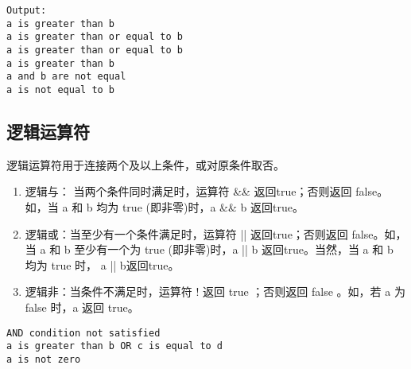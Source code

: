 \begin{frame}[fragile]\ft{\subsecname}
\begin{lstlisting}[backgroundcolor=\color{red!10}]
Output:
a is greater than b
a is greater than or equal to b
a is greater than or equal to b
a is greater than b
a and b are not equal
a is not equal to b  
\end{lstlisting}  
\end{frame}


\subsection{逻辑运算符}
\begin{frame}
  逻辑运算符用于连接两个及以上条件，或对原条件取否。%
\begin{enumerate}
\item
  \textcolor{acolor3}{逻辑与}： 当两个条件同时满足时，运算符 {\tf \&\&} 返回{\tf true}；否则返回 {\tf false}。如，当 {\tf a} 和 {\tf b} 均为 {\tf true} (即非零)时，{\tf a \&\& b} 返回{\tf true}。
\item
  \textcolor{acolor3}{逻辑或}：当至少有一个条件满足时，运算符 {\tf ||} 返回{\tf true}；否则返回 {\tf false}。如，当 {\tf a} 和 {\tf b} 至少有一个为 {\tf true} (即非零)时，{\tf a || b} 返回{\tf true}。当然，当 {\tf a} 和 {\tf b} 均为 {\tf true} 时， {\tf a || b}返回{\tf true}。
\item
  \textcolor{acolor3}{逻辑非}：当条件不满足时，运算符 {\tf !} 返回 {\tf true} ；否则返回 {\tf false} 。如，若 {\tf a} 为 {\tf false} 时，{\tf a} 返回 {\tf true}。
\end{enumerate}
  
\end{frame}

\begin{frame}\ft{\subsecname}

  
\end{frame}


\begin{frame}[fragile]\ft{\subsecname}

\begin{lstlisting}[backgroundcolor=\color{red!10}]
AND condition not satisfied
a is greater than b OR c is equal to d
a is not zero  
\end{lstlisting}
\end{frame}

